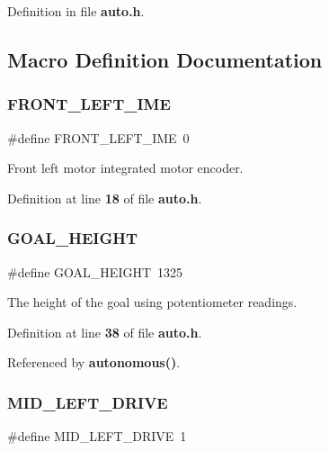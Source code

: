 Definition in file \textbf{ auto.\+h}.



\subsection{Macro Definition Documentation}
\mbox{\label{auto_8h_a7bc3203ebc61f8414788156a8616047c}} 
\subsubsection{F\+R\+O\+N\+T\+\_\+\+L\+E\+F\+T\+\_\+\+I\+ME}
{\footnotesize\ttfamily \#define F\+R\+O\+N\+T\+\_\+\+L\+E\+F\+T\+\_\+\+I\+ME~0}



Front left motor integrated motor encoder. 



Definition at line \textbf{ 18} of file \textbf{ auto.\+h}.

\mbox{\label{auto_8h_a83cf08759ac4ffc3ea6e3b7f9c406b3c}} 
\subsubsection{G\+O\+A\+L\+\_\+\+H\+E\+I\+G\+HT}
{\footnotesize\ttfamily \#define G\+O\+A\+L\+\_\+\+H\+E\+I\+G\+HT~1325}



The height of the goal using potentiometer readings. 



Definition at line \textbf{ 38} of file \textbf{ auto.\+h}.



Referenced by \textbf{ autonomous()}.

\mbox{\label{auto_8h_a811b1777cccc7f0e3abbec1874715f0a}} 
\subsubsection{M\+I\+D\+\_\+\+L\+E\+F\+T\+\_\+\+D\+R\+I\+VE}
{\footnotesize\ttfamily \#define M\+I\+D\+\_\+\+L\+E\+F\+T\+\_\+\+D\+R\+I\+VE~1}



